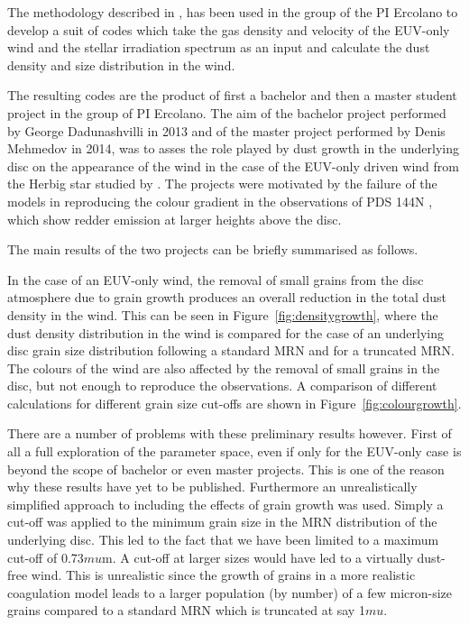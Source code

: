 \documentclass[10pt,fleqn,twoside]{article}
\begin{document}
The methodology described in \citet{2011MNRAS.411.1104O}, has been
used in the group of the PI Ercolano to develop a suit of codes which
take the gas density and velocity of the EUV-only wind and the stellar
irradiation spectrum as an input and calculate the dust density and
size distribution in the wind. 

The resulting codes are the product of first a bachelor and then a master
student project in the group of PI Ercolano. The aim of the bachelor project
performed by George Dadunashvilli in 2013 and of the master project
performed  by Denis Mehmedov in 2014, was to asses the role played by
dust growth in the underlying disc on the appearance of the wind in
the case of the EUV-only driven wind from the Herbig star studied by
\citet{2011MNRAS.411.1104O}. 
The projects were motivated by the failure of the \citet{2011MNRAS.411.1104O} 
models in reproducing the colour gradient in the observations
of PDS 144N \citep[e.g.,][]{2006ApJ...645.1272P}, which show redder emission at
larger heights above the disc. 

The main results of the two projects can be briefly summarised as
follows. 

In the case of an EUV-only wind, the removal of small grains from the disc atmosphere due to grain
growth produces an overall reduction in the total dust density in the
wind. This can be seen in Figure~\ref{fig:densitygrowth}, where the
dust density distribution in the wind is compared for the case of an
underlying disc grain size distribution following a 
standard MRN \citep{1977ApJ...217..425M} and for a truncated 
MRN. The colours of the wind are also affected by the removal of small
grains in the disc, but not enough to reproduce the observations. A
comparison of different calculations for different grain size cut-offs
are shown in Figure~\ref{fig:colourgrowth}. 

There are a number of problems with these preliminary results
however. First of all
a full exploration of the parameter space, even if only for the
EUV-only case is beyond the scope of bachelor or even master
projects. This is one of the reason why these results have yet to be 
published. Furthermore an unrealistically simplified approach to 
including the effects of grain growth was used. Simply a cut-off was
applied to the minimum grain size in the MRN distribution of the
underlying disc. This led to the fact that we have been limited to a
maximum cut-off of 0.73$mu$m. A cut-off at larger sizes would have led
to a virtually dust-free wind. This is unrealistic since the growth of
grains in a more realistic coagulation model leads to a larger population (by
number) of a few micron-size grains compared to a standard MRN which
is truncated at say 1$mu$. 
\end{document}

